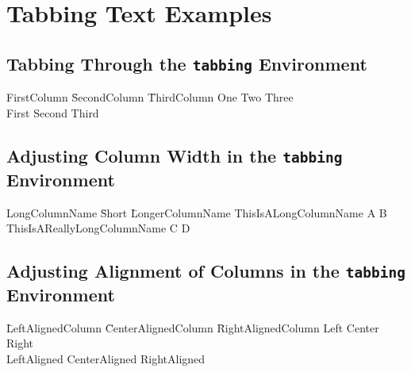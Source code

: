 \documentclass[a4paper]{article}
\begin{document}
\section{Tabbing Text Examples}

\subsection{Tabbing Through the \texttt{tabbing} Environment}

\begin{tabbing}
    FirstColumn \= SecondColumn \= ThirdColumn \kill
    One \> Two \> Three \\
    First \> Second \> Third \\
\end{tabbing}

\subsection{Adjusting Column Width in the \texttt{tabbing} Environment}

\begin{tabbing}
    LongColumnName \= Short \= LongerColumnName \kill
    ThisIsALongColumnName \> A \> B \\
    ThisIsAReallyLongColumnName \> C \> D \\
\end{tabbing}

\subsection{Adjusting Alignment of Columns in the \texttt{tabbing} Environment}

\begin{tabbing}
    \= LeftAlignedColumn \= CenterAlignedColumn \= RightAlignedColumn \kill
    \> Left \> Center \> Right \\
    \> LeftAligned \> CenterAligned \> RightAligned \\
\end{tabbing}
\end{document}
